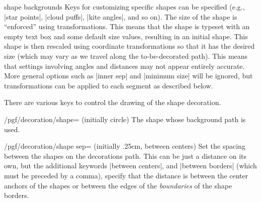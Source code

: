 \begin{decoration}{shape backgrounds}
    Keys for customizing specific shapes can be specified (e.g., |star points|,
    |cloud puffs|, |kite angles|, and so on). The size of the shape is
    ``enforced'' using transformations. This means that the shape is typeset
    with an empty text box and some default size values, resulting in an
    initial shape. This shape is then rescaled using coordinate transformations
    so that it has the desired size (which may vary as we travel along the
    to-be-decorated path). This means that settings involving angles and
    distances may not appear entirely accurate. More general options such as
    |inner sep| and |minimum size| will be ignored,  but transformations can be
    applied to each segment as described below.
\begin{codeexample}[preamble={\usetikzlibrary{decorations.shapes,shapes.geometric}}]
\end{codeexample}

    There are various keys to control the drawing of the shape decoration.

    \begin{key}{/pgf/decoration/shape= (initially circle)}
        The shape whose background path is used.
    \end{key}

    \begin{key}{/pgf/decoration/shape sep= (initially {.25cm, between centers})}
        Set the spacing between the shapes on the decorations path. This can be
        just a distance on its own, but the additional keywords
        |between centers|, and |between borders| (which must be preceded by a
        comma), specify that the distance  is between the center anchors of the
        shapes or between the edges of the \emph{boundaries} of the shape
        borders.
\begin{codeexample}[preamble={\usetikzlibrary{decorations.shapes,shapes.symbols}}]
\end{codeexample}
    \end{key}


\end{decoration}

